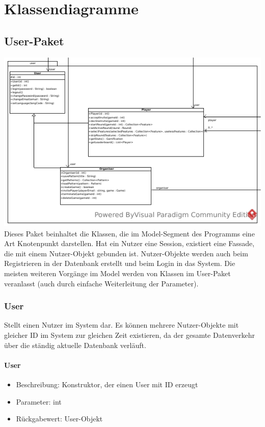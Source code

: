 \documentclass[a4paper]{scrreprt}
\begin{document}
	\chapter{Klassendiagramme}

	\section{User-Paket}
	\includegraphics[width=\textwidth]{img/package/user.pdf}
	Dieses Paket beinhaltet die Klassen, die im Model-Segment des Programms eine Art Knotenpunkt darstellen. Hat ein Nutzer eine Session, existiert
	eine Fassade, die mit einem Nutzer-Objekt gebunden ist. Nutzer-Objekte werden auch beim Registrieren in der Datenbank erstellt und beim Login
	in das System. Die meisten weiteren Vorgänge im Model werden von Klassen im User-Paket veranlasst (auch durch einfache Weiterleitung der Parameter).
	\subsection{User}
	Stellt einen Nutzer im System dar. Es können mehrere Nutzer-Objekte mit gleicher ID im System zur gleichen Zeit existieren, da der gesamte Datenverkehr über die ständig aktuelle Datenbank verläuft.
	\subsubsection{User}
	\begin{itemize}
		\item Beschreibung: Konstruktor, der einen User mit ID erzeugt
		\item Parameter: int
		\item Rückgabewert: User-Objekt
	\end{itemize}
\end{document}
